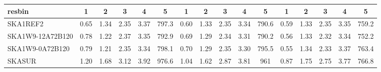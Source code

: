 \begin{table}[!htp]
{{\begin{tabular}{|lccccc||ccccc||ccccc|}
 resbin  &1 & 2 & 3 & 4 & 5 & 1 & 2 & 3 & 4 & 5 & 1 & 2 & 3 & 4 & 5 \tabularnewline \hline
SKA1REF2 & 0.65 \cellcolor{blue!18.00} & 1.34 \cellcolor{red!29.33} & 2.35 \cellcolor{green!18.00} & 3.37 \cellcolor{orange!20.22} & 797.3 \cellcolor{purple!19.01} & 0.60 \cellcolor{blue!18.00} & 1.33 \cellcolor{red!23.33} & 2.35 \cellcolor{green!19.11} & 3.34 \cellcolor{orange!21.22} & 790.6 \cellcolor{purple!18.09} & 0.59 \cellcolor{blue!22.62} & 1.33 \cellcolor{red!18.00} & 2.35 \cellcolor{green!21.26} & 3.35 \cellcolor{orange!18.52} & 759.2 \cellcolor{purple!38.11}\\ \hline 
SKA1W9-12A72B120 & 0.78 \cellcolor{blue!28.32} & 1.22 \cellcolor{red!19.15} & 2.37 \cellcolor{green!19.18} & 3.35 \cellcolor{orange!18.86} & 792.9 \cellcolor{purple!18.00} & 0.69 \cellcolor{blue!27.25} & 1.29 \cellcolor{red!18.21} & 2.34 \cellcolor{green!18.00} & 3.31 \cellcolor{orange!18.65} & 790.2 \cellcolor{purple!18.00} & 0.56 \cellcolor{blue!18.49} & 1.33 \cellcolor{red!18.00} & 2.32 \cellcolor{green!18.00} & 3.34 \cellcolor{orange!18.00} & 752.2 \cellcolor{purple!18.00}\\ \hline 
SKA1W9-0A72B120 & 0.79 \cellcolor{blue!28.64} & 1.21 \cellcolor{red!18.00} & 2.35 \cellcolor{green!18.24} & 3.34 \cellcolor{orange!18.00} & 798.1 \cellcolor{purple!19.19} & 0.70 \cellcolor{blue!27.34} & 1.29 \cellcolor{red!18.00} & 2.35 \cellcolor{green!18.96} & 3.30 \cellcolor{orange!18.00} & 795.5 \cellcolor{purple!19.31} & 0.55 \cellcolor{blue!18.00} & 1.34 \cellcolor{red!18.66} & 2.33 \cellcolor{green!19.55} & 3.37 \cellcolor{orange!20.52} & 763.4 \cellcolor{purple!50.06}\\ \hline 
SKASUR & 1.20 \cellcolor{blue!60.00} & 1.68 \cellcolor{red!60.00} & 3.12 \cellcolor{green!60.00} & 3.92 \cellcolor{orange!60.00} & 976.6 \cellcolor{purple!60.00} & 1.04 \cellcolor{blue!60.00} & 1.62 \cellcolor{red!60.00} & 2.87 \cellcolor{green!60.00} & 3.81 \cellcolor{orange!60.00} & 961 \cellcolor{purple!60.00} & 0.87 \cellcolor{blue!60.00} & 1.75 \cellcolor{red!60.00} & 2.75 \cellcolor{green!60.00} & 3.77 \cellcolor{orange!60.00} & 766.8 \cellcolor{purple!60.00}\tabularnewline \hline 
\end{tabular}}\hfil 
{}}
\end{table}
